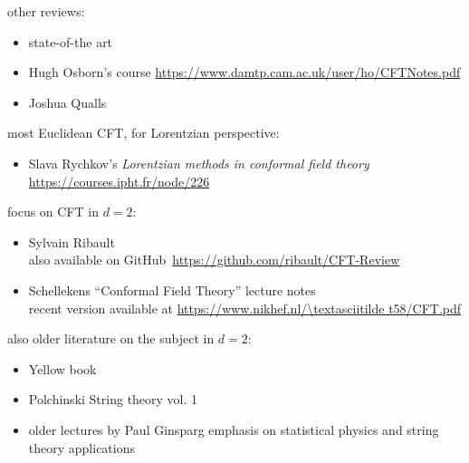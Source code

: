 \documentclass[a4paper,12pt]{article}
\numberwithin{equation}{section}
\begin{document}

other reviews:

\begin{itemize}

\item
state-of-the art
\cite{Poland:2018epd}

\item
Hugh Osborn's course 
\url{https://www.damtp.cam.ac.uk/user/ho/CFTNotes.pdf}

\item
Joshua Qualls \cite{Qualls:2015qjb}

\end{itemize}


most Euclidean CFT, for Lorentzian perspective:
\begin{itemize}

\item
Slava Rychkov's \emph{Lorentzian methods in conformal field theory}
\url{https://courses.ipht.fr/node/226}


\end{itemize}


focus on CFT in $d = 2$:
\begin{itemize}

\item
Sylvain Ribault \cite{Ribault:2014hia} \\
also available on GitHub~\url{https://github.com/ribault/CFT-Review}

\item
Schellekens ``Conformal Field Theory'' lecture notes~\cite{Schellekens:1996tg} \\
recent version available at
\url{https://www.nikhef.nl/\textasciitilde t58/CFT.pdf}

\end{itemize}

also older literature on the subject  in $d = 2$:
\begin{itemize}

\item
Yellow book
\cite{DiFrancesco:1997nk}

\item
Polchinski String theory vol. 1
\cite{Polchinski:1998rq}

\item
older lectures by Paul Ginsparg
\cite{Ginsparg:1988ui}
emphasis on statistical physics and string theory applications

\end{itemize}
\end{document}
